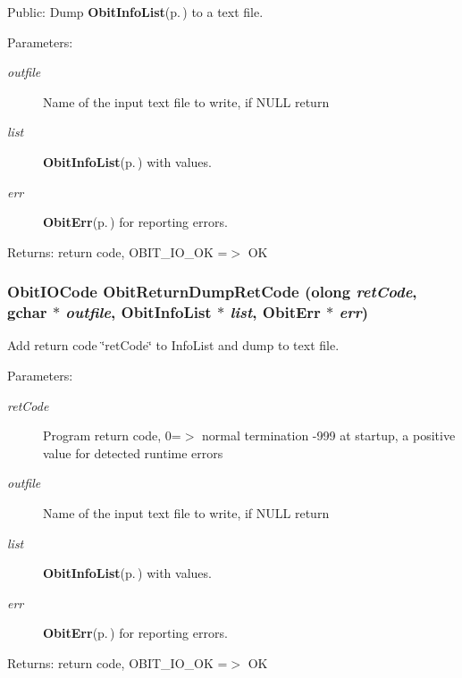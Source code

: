 Public: Dump {\bf Obit\-Info\-List}{\rm (p.\,\pageref{structObitInfoList})} to a text file. 

\begin{Desc}
\item[Parameters:]
\begin{description}
\item[{\em outfile}]Name of the input text file to write, if NULL return \item[{\em list}]{\bf Obit\-Info\-List}{\rm (p.\,\pageref{structObitInfoList})} with values. \item[{\em err}]{\bf Obit\-Err}{\rm (p.\,\pageref{structObitErr})} for reporting errors. \end{description}
\end{Desc}
\begin{Desc}
\item[Returns:]return code, OBIT\_\-IO\_\-OK =$>$ OK \end{Desc}
\subsubsection{\setlength{\rightskip}{0pt plus 5cm}Obit\-IOCode Obit\-Return\-Dump\-Ret\-Code ({\bf olong} {\em ret\-Code}, gchar $\ast$ {\em outfile}, {\bf Obit\-Info\-List} $\ast$ {\em list}, {\bf Obit\-Err} $\ast$ {\em err})}\label{ObitReturn_8c_a1}


Add return code \char`\"{}ret\-Code\char`\"{} to Info\-List and dump to text file. 

\begin{Desc}
\item[Parameters:]
\begin{description}
\item[{\em ret\-Code}]Program return code, 0=$>$ normal termination -999 at startup, a positive value for detected runtime errors \item[{\em outfile}]Name of the input text file to write, if NULL return \item[{\em list}]{\bf Obit\-Info\-List}{\rm (p.\,\pageref{structObitInfoList})} with values. \item[{\em err}]{\bf Obit\-Err}{\rm (p.\,\pageref{structObitErr})} for reporting errors. \end{description}
\end{Desc}
\begin{Desc}
\item[Returns:]return code, OBIT\_\-IO\_\-OK =$>$ OK \end{Desc}
